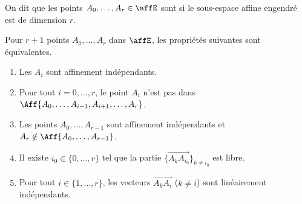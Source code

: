 \begin{definition}
	On dit que les points \( A_0,\ldots, A_r\in \affE\) sont  si le sous-espace affine engendré est de dimension \( r\).
\end{definition}

\begin{proposition}  \label{PropGAneHg}
	Pour \( r+1\) points \( A_0,\ldots, A_r\) dans \( \affE\), les propriétés suivantes sont équivalentes.
	\begin{enumerate}
		\item		\label{ITEMooONZHooWIzXdw}
		      Les \( A_i\) sont affinement indépendants.
		\item \label{ITEMooOMCRooNiRtSW}
		      Pour tout \( i=0,\ldots, r\), le point \( A_i\) n'est pas dans \( \Aff\{ A_0,\ldots, A_{i-1}, A_{i+1},\ldots, A_r \}\).
		      \item\label{ItemrAzkIl}
		      Les points \( A_0,\ldots, A_{r-1}\) sont affinement indépendants et \( A_r\notin\Aff\{ A_0,\ldots, A_{r-1} \}\).
		\item		\label{ITEMooSLMDooFOHLEG}
		      Il existe \( i_0\in\{ 0,\ldots,r \}\) tel que la partie \( \{ \overrightarrow{ A_kA_{i_0} } \}_{k\neq i_0}\) est libre.
		      \item\label{ItemFBfcuq}
		      Pour tout \( i\in\{ 1,\ldots, r \}\), les vecteurs \( \overrightarrow{ A_kA_i }\) (\( k\neq i\)) sont linéairement indépendants.
	\end{enumerate}
\end{proposition}


